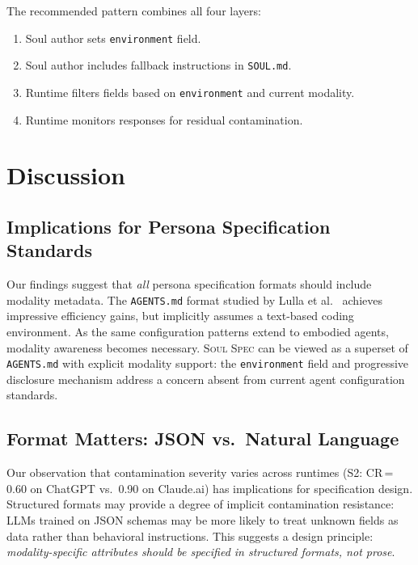 \documentclass[manuscript,screen,nonacm]{acmart}
\begin{document}
The recommended pattern combines all four layers:
\begin{enumerate}
    \item Soul author sets \texttt{environment} field.
    \item Soul author includes fallback instructions in \texttt{SOUL.md}.
    \item Runtime filters fields based on \texttt{environment} and current modality.
    \item Runtime monitors responses for residual contamination.
\end{enumerate}


\section{Discussion}
\label{sec:discussion}

\subsection{Implications for Persona Specification Standards}

Our findings suggest that \emph{all} persona specification formats should include modality metadata.
The \texttt{AGENTS.md} format studied by Lulla et al.~\cite{jai2025agents} achieves impressive efficiency gains, but implicitly assumes a text-based coding environment.
As the same configuration patterns extend to embodied agents, modality awareness becomes necessary.
\textsc{Soul Spec} can be viewed as a superset of \texttt{AGENTS.md} with explicit modality support: the \texttt{environment} field and progressive disclosure mechanism address a concern absent from current agent configuration standards.

\subsection{Format Matters: JSON vs.\ Natural Language}

Our observation that contamination severity varies across runtimes (S2: CR\,=\,0.60 on ChatGPT vs.\ 0.90 on Claude.ai) has implications for specification design.
Structured formats may provide a degree of implicit contamination resistance: LLMs trained on JSON schemas may be more likely to treat unknown fields as data rather than behavioral instructions.
This suggests a design principle: \emph{modality-specific attributes should be specified in structured formats, not prose}.
\end{document}
